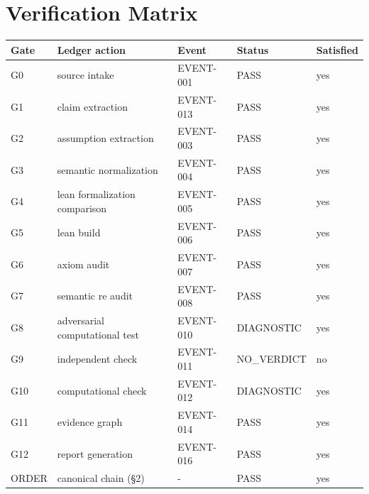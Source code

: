 \documentclass[11pt]{article}
\begin{document}
\section{Verification Matrix}
\begin{longtable}{lllll}
\toprule Gate & Ledger action & Event & Status & Satisfied \\ \midrule \endhead
G0 & source intake & EVENT-001 & PASS & yes \\
G1 & claim extraction & EVENT-013 & PASS & yes \\
G2 & assumption extraction & EVENT-003 & PASS & yes \\
G3 & semantic normalization & EVENT-004 & PASS & yes \\
G4 & lean formalization comparison & EVENT-005 & PASS & yes \\
G5 & lean build & EVENT-006 & PASS & yes \\
G6 & axiom audit & EVENT-007 & PASS & yes \\
G7 & semantic re audit & EVENT-008 & PASS & yes \\
G8 & adversarial computational test & EVENT-010 & DIAGNOSTIC & yes \\
G9 & independent check & EVENT-011 & NO\_VERDICT & no \\
G10 & computational check & EVENT-012 & DIAGNOSTIC & yes \\
G11 & evidence graph & EVENT-014 & PASS & yes \\
G12 & report generation & EVENT-016 & PASS & yes \\
ORDER & canonical chain (\S{}2) & - & PASS & yes \\
\bottomrule
\end{longtable}
\end{document}
